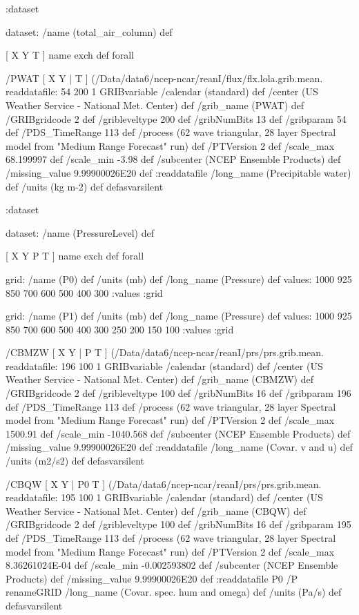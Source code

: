 \begin{ingrid}
 :dataset

 dataset: /name (total_air_column) def

 [ X Y T ] { name exch def } forall

  /PWAT { [ X Y | T ] (/Data/data6/ncep-ncar/reanI/flux/flx.lola.grib.mean.%
  readdatafile:
  54 200 1 GRIBvariable
  /calendar (standard) def
  /center (US Weather Service - National Met. Center) def
  /grib_name (PWAT) def
  /GRIBgridcode 2 def
  /gribleveltype 200 def
  /gribNumBits 13 def
  /gribparam 54 def
  /PDS_TimeRange 113 def
  /process (62 wave triangular, 28 layer Spectral model from "Medium Range Forecast" run) def
  /PTVersion 2 def
  /scale_max 68.199997 def
  /scale_min -3.98 def
  /subcenter (NCEP Ensemble Products) def
  /missing_value 9.99900026E20 def
  :readdatafile
  /long_name (Precipitable water) def
  /units (kg m-2) def
  } defasvarsilent

 :dataset

 dataset: /name (PressureLevel) def

 [ X Y P T ] { name exch def } forall

grid:
/name (P0) def
/units (mb) def
/long_name (Pressure) def
values: 1000 925 850 700 600 500 400 300 :values
:grid

grid:
/name (P1) def
/units (mb) def
/long_name (Pressure) def
values: 1000 925 850 700 600 500 400 300 250 200 150 100 :values
:grid

  /CBMZW { [ X Y | P T ] (/Data/data6/ncep-ncar/reanI/prs/prs.grib.mean.%
  readdatafile:
  196 100 1 GRIBvariable
  /calendar (standard) def
  /center (US Weather Service - National Met. Center) def
  /grib_name (CBMZW) def
  /GRIBgridcode 2 def
  /gribleveltype 100 def
  /gribNumBits 16 def
  /gribparam 196 def
  /PDS_TimeRange 113 def
  /process (62 wave triangular, 28 layer Spectral model from "Medium Range Forecast" run) def
  /PTVersion 2 def
  /scale_max 1500.91 def
  /scale_min -1040.568 def
  /subcenter (NCEP Ensemble Products) def
  /missing_value 9.99900026E20 def
  :readdatafile
  /long_name (Covar. v and u) def
  /units (m2/s2) def
  } defasvarsilent

  /CBQW { [ X Y | P0 T ] (/Data/data6/ncep-ncar/reanI/prs/prs.grib.mean.%
  readdatafile:
  195 100 1 GRIBvariable
  /calendar (standard) def
  /center (US Weather Service - National Met. Center) def
  /grib_name (CBQW) def
  /GRIBgridcode 2 def
  /gribleveltype 100 def
  /gribNumBits 16 def
  /gribparam 195 def
  /PDS_TimeRange 113 def
  /process (62 wave triangular, 28 layer Spectral model from "Medium Range Forecast" run) def
  /PTVersion 2 def
  /scale_max 8.36261024E-04 def
  /scale_min -0.002593802 def
  /subcenter (NCEP Ensemble Products) def
  /missing_value 9.99900026E20 def
  :readdatafile
  P0 /P renameGRID
  /long_name (Covar. spec. hum and omega) def
  /units (Pa/s) def
  } defasvarsilent


\end{ingrid}

